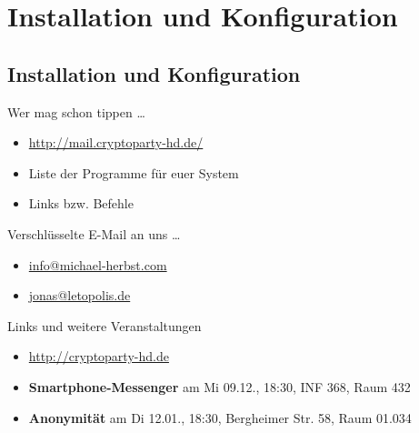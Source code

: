 \section{Installation und Konfiguration}
\subsection*{Installation und Konfiguration}
\begin{frame}{Wer mag schon tippen \dots}
	\begin{itemize}
		\item \url{http://mail.cryptoparty-hd.de/}
		\item Liste der Programme für euer System
		\item Links bzw. Befehle
	\end{itemize}
\end{frame}

\blackframe

%

\begin{frame}{Verschlüsselte E-Mail an uns \dots}
	\begin{itemize}
		\item \url{info@michael-herbst.com}
		\item \url{jonas@letopolis.de}
	\end{itemize}
\end{frame}

\blackframe

%
%
%

\begin{frame}{Links und weitere Veranstaltungen}
	\begin{itemize}
		\item \url{http://cryptoparty-hd.de} \\[10pt]
		\item \textbf{Smartphone-Messenger} am Mi 09.12., 18:30, INF 368, Raum 432
		\item \textbf{Anonymität} am Di 12.01., 18:30, Bergheimer Str. 58, Raum 01.034
	\end{itemize}
\end{frame}



